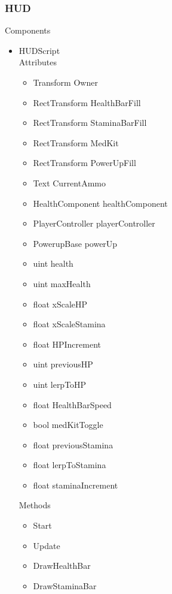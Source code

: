 \documentclass[11pt]{article}
\begin{document}
\subsubsection{HUD}
Components
\begin{itemize}
\item HUDScript
\\Attributes
\begin{itemize}
\item Transform Owner
\item RectTransform HealthBarFill
\item RectTransform StaminaBarFill
\item RectTransform MedKit
\item RectTransform PowerUpFill
\item Text CurrentAmmo
\item HealthComponent healthComponent
\item PlayerController playerController
\item PowerupBase powerUp
\item uint health
\item uint maxHealth
\item float xScaleHP
\item float xScaleStamina
\item float HPIncrement
\item uint previousHP
\item uint lerpToHP
\item float HealthBarSpeed
\item bool medKitToggle
\item float previousStamina
\item float lerpToStamina
\item float staminaIncrement
\end{itemize}
Methods
\begin{itemize}
\item Start
\item Update
\item DrawHealthBar
\item DrawStaminaBar
\end{itemize}
\end{itemize}
\end{document}
